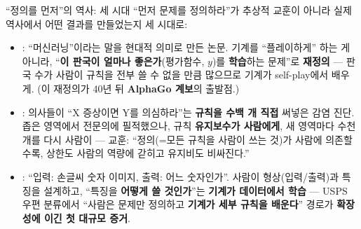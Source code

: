 \begin{frame}{``정의를 먼저''의 역사: 세 시대}
  \small
  ``먼저 문제를 정의하라''가 추상적 교훈이 아니라 실제 역사에서 어떤
  결과를 만들었는지 세 시대로:
  \begin{itemize}
    \item {}: ``머신러닝''이라는
      말을 현대적 의미로 만든 논문. 기계를 ``플레이하게'' 하는 게
      아니라, ``\textbf{이 판국이 얼마나 좋은가}(평가함수, $y$)를
      \textbf{학습}하는 문제''로 \textbf{재정의} --- 판국 수가 사람이
      규칙을 전부 쓸 수 없을 만큼 많으므로 기계가 self-play에서 배우게.
      (이 재정의가 40년 뒤 \textbf{AlphaGo 계보}의 출발점.)
    \item {}:
      의사들이 ``X 증상이면 Y를 의심하라''는 \textbf{규칙을 수백 개
      직접} 써넣은 감염 진단. 좁은 영역에서 전문의에 필적했으나,
      규칙 \textbf{유지보수가 사람에게}, 새 영역마다 수천 개를 다시
      사람이 --- 교훈: ``정의(=모든 규칙을 사람이 쓰는 것)가 사람에
      의존할수록, 상한도 사람의 역량에 갇히고 유지비도 비싸진다.''
    \item {}: ``입력: 손글씨
      숫자 이미지, 출력: 어느 숫자인가''. 사람이 형상(입력/출력)과
      특징을 설계하고, ``특징을 \textbf{어떻게 쓸 것인가}''는
      \textbf{기계가 데이터에서 학습} --- USPS 우편 분류에서
      ``사람은 문제만 정의하고 \textbf{기계가 세부 규칙을 배운다}''
      경로가 \textbf{확장성에 이긴 첫 대규모 증거}.
  \end{itemize}
\end{frame}
